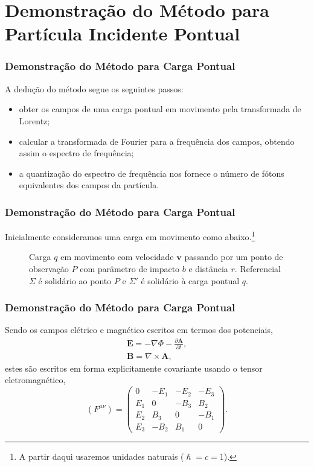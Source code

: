 \documentclass[xcolor=dvipsnames]{beamer}
\renewcommand{\vec}{\mathbf}
\begin{document}
\section{Demonstração do Método para Partícula Incidente Pontual}
\begin{frame}
	\frametitle{Demonstração do Método para Carga Pontual}
	A dedução do método segue os seguintes passos:
	\begin{itemize}
		\item obter os campos de uma carga pontual em movimento pela
			transformada de Lorentz;
		\item calcular a transformada de Fourier para a frequência dos campos,
			obtendo assim o espectro de frequência;
		\item a quantização do espectro de frequência nos fornece o número de
			fótons equivalentes dos campos da partícula.
	\end{itemize}
\end{frame}

\begin{frame}
	\frametitle{Demonstração do Método para Carga Pontual}
	Inicialmente consideramos uma carga em movimento como abaixo.\footnote{A
	partir daqui usaremos unidades naturais ($\hslash = c = 1$).}
	\begin{figure}
	
	\caption{Carga $q$ em movimento com velocidade $\vec{v}$ passando por um
		ponto de observação $P$ com parâmetro de impacto $b$ e distância $r$.
		Referencial $\Sigma$ é solidário ao ponto $P$ e $\Sigma '$ é solidário
		à carga pontual $q$.}
	\end{figure}
\end{frame}

\begin{frame}
	\frametitle{Demonstração do Método para Carga Pontual}
	Sendo os campos elétrico e magnético escritos em termos dos potenciais,
	\begin{gather}
		\vec{E} = - \nabla \Phi - \frac{\partial \vec{A}}{\partial t}, \\
		\vec{B} = \nabla \times \vec{A},
	\end{gather}
	estes são escritos em forma explicitamente covariante usando o tensor
	eletromagnético,
	\begin{equation}
		(F^{\mu \nu}) = \begin{pmatrix}
			0 & -E_1 & -E_2 & -E_3 \\
			E_1 & 0 & -B_3 & B_2 \\
			E_2 & B_3 & 0 & -B_1 \\
			E_3 & -B_2 & B_1 & 0
		\end{pmatrix}.
	\end{equation}
\end{frame}
\end{document}

